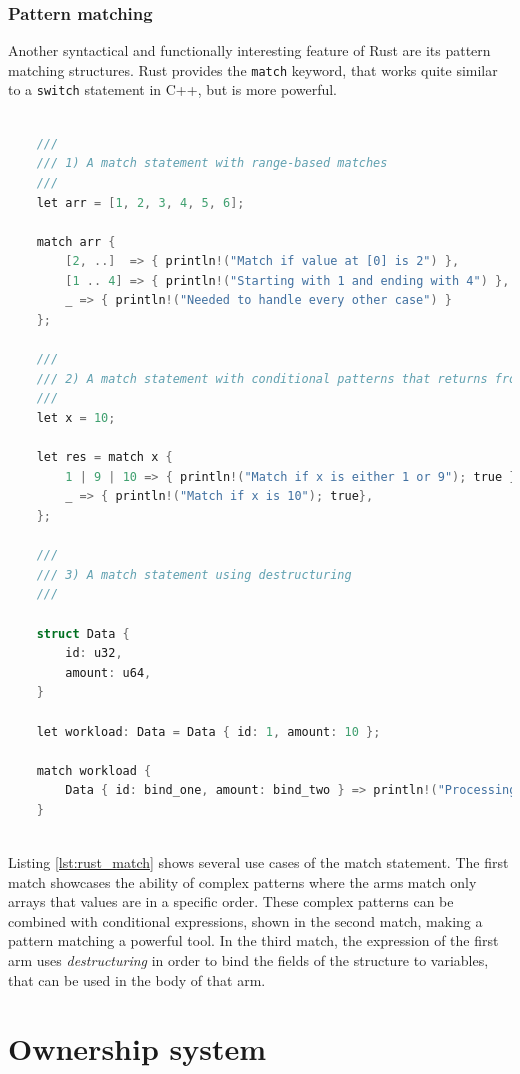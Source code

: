\subsubsection{Pattern matching}

Another syntactical and functionally interesting feature of Rust are its pattern matching structures. Rust provides the \texttt{match} keyword, that works quite similar to a \texttt{switch} statement in C++, but is more powerful. 

\begin{lstlisting}[caption={Match statement in Rust, allowing for complex pattern matching in each arm}, label={lst:rust_match}, language=C]

	///
	/// 1) A match statement with range-based matches
	///
	let arr = [1, 2, 3, 4, 5, 6];
	
	match arr {
		[2, ..]  => { println!("Match if value at [0] is 2") },
		[1 .. 4] => { println!("Starting with 1 and ending with 4") },
		_ => { println!("Needed to handle every other case") }
	};
	
	///
	/// 2) A match statement with conditional patterns that returns from every arm
	///
	let x = 10;
	
	let res = match x {
		1 | 9 | 10 => { println!("Match if x is either 1 or 9"); true },
		_ => { println!("Match if x is 10"); true},
	};
	
	///
	/// 3) A match statement using destructuring
	///
	
	struct Data { 
		id: u32,
		amount: u64, 
	}
	
	let workload: Data = Data { id: 1, amount: 10 };
	
	match workload {
		Data { id: bind_one, amount: bind_two } => println!("Processing id: {} with amount: {}", bind_one, bind_two),
	}
	
\end{lstlisting}

\noindent
Listing \ref{lst:rust_match} shows several use cases of the match statement. The first match showcases the ability of complex patterns where the arms match only arrays that values are in a specific order. These complex patterns can be combined with conditional expressions, shown in the second match, making a pattern matching a powerful tool. In the third match, the expression of the first arm uses \textit{destructuring} in order to bind the fields of the structure to variables, that can be used in the body of that arm.

\section{Ownership system}

